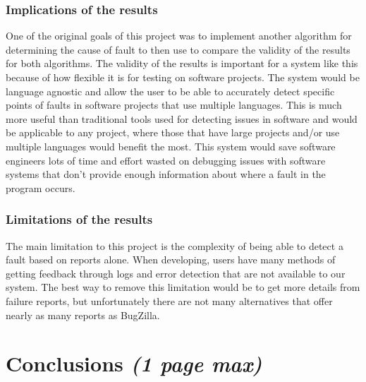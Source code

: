 \documentclass[12pt]{article}
\begin{document}
\hypertarget{implications-of-the-results}{%
\subsubsection{Implications of the
results}\label{implications-of-the-results}}

One of the original goals of this project was to implement another
algorithm for determining the cause of fault to then use to compare the
validity of the results for both algorithms. The validity of the results
is important for a system like this because of how flexible it is for
testing on software projects. The system would be language agnostic and
allow the user to be able to accurately detect specific points of faults
in software projects that use multiple languages. This is much more
useful than traditional tools used for detecting issues in software and
would be applicable to any project, where those that have large projects
and/or use multiple languages would benefit the most. This system would
save software engineers lots of time and effort wasted on debugging
issues with software systems that don't provide enough information about
where a fault in the program occurs.

\hypertarget{limitations-of-the-results}{%
\subsubsection{Limitations of the
results}\label{limitations-of-the-results}}

The main limitation to this project is the complexity of being able to
detect a fault based on reports alone. When developing, users have many
methods of getting feedback through logs and error detection that are
not available to our system. The best way to remove this limitation
would be to get more details from failure reports, but unfortunately
there are not many alternatives that offer nearly as many reports as
BugZilla.

\hypertarget{conclusions-1-page-max}{%
\section{\texorpdfstring{Conclusions \emph{(1 page
max)}}{Conclusions (1 page max)}}\label{conclusions-1-page-max}}
\end{document}
